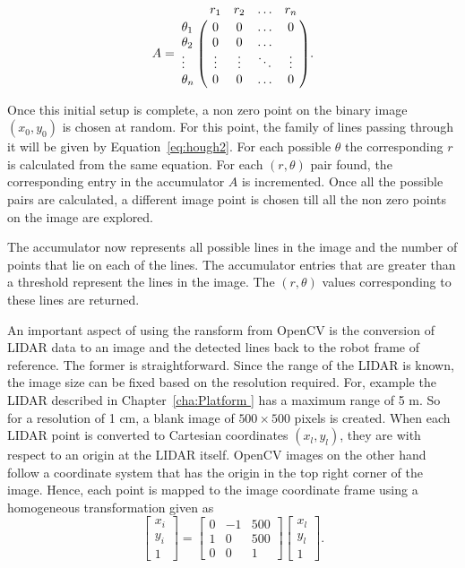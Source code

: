 \begin{equation}
A=\bordermatrix{~  & r_1 & r_2&\ldots & r_n \cr
              \theta_1& 0 &  0  & \ldots & 0\cr
              \theta_2& 0  &  0 & \ldots & \cr
              \vdots& \vdots & \vdots & \ddots & \vdots\cr
              \theta_n& 0  &   0       &\ldots & 0}.
\label{eq:hough3}
\end{equation} 

 Once this initial setup is complete, a non zero point on the binary image $ (x_0,y_0) $ is chosen at random. For this point, the family of lines passing through it will be given by Equation~\ref{eq:hough2}. For each possible $ \theta $ the corresponding $ r $ is calculated from the same equation. For each $ (r,\theta) $ pair found, the corresponding entry in the accumulator $ A $ is incremented. Once all the possible pairs are calculated, a different image point is chosen till all the non zero points on the image are explored. 
 
 The accumulator now represents all possible lines in the image and the number of points that lie on each of the lines. The accumulator entries that are greater than a threshold represent the lines in the image. The $ (r,\theta) $ values corresponding to these lines are returned. 
 
 An important aspect of using the ransform from OpenCV is the conversion of LIDAR data to an image and the detected lines back to the robot frame of reference. The former is straightforward. Since the range of the LIDAR is known, the image size can be fixed based on the resolution required. For, example the LIDAR described in Chapter~\ref{cha:Platform } has a maximum range of 5 m. So for a resolution of 1 cm, a blank image of $ 500 \times 500 $ pixels is created. When each LIDAR point is converted to Cartesian coordinates $ (x_l,y_l) $, they are with respect to an origin at the LIDAR itself. OpenCV images on the other hand follow a coordinate system that has the origin in the top right corner of the image. Hence, each point is mapped to the image coordinate frame using a homogeneous transformation given as
 \begin{equation}
 \begin{bmatrix}
 x_i\\y_i\\1
 \end{bmatrix}=
 \begin{bmatrix}
 0 & -1 & 500\\
 1 & 0 & 500\\
 0 & 0 & 1
 \end{bmatrix}
 \begin{bmatrix}
 x_l\\y_l\\1
 \end{bmatrix}.
 \label{eq:hough4}
 \end{equation}
 
